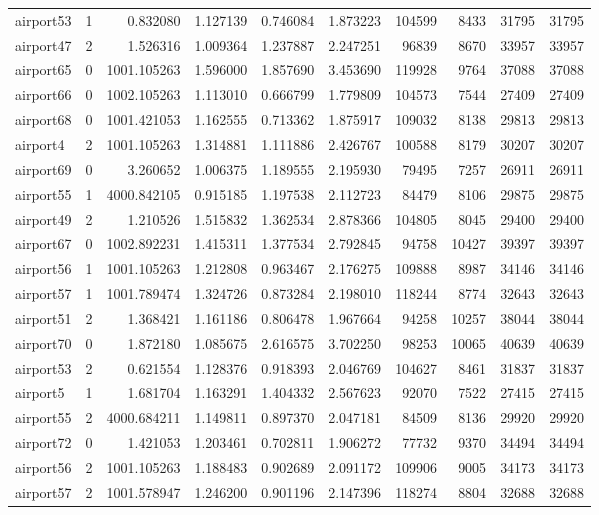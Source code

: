 \begin{longtable}{|l|r|r|r|r|r|r|r|r|r|}
airport53 & 1 & 0.832080 & 1.127139 & 0.746084 & 1.873223 & 104599 & 8433 & 31795 & 31795 \\
airport47 & 2 & 1.526316 & 1.009364 & 1.237887 & 2.247251 & 96839 & 8670 & 33957 & 33957 \\
airport65 & 0 & 1001.105263 & 1.596000 & 1.857690 & 3.453690 & 119928 & 9764 & 37088 & 37088 \\
airport66 & 0 & 1002.105263 & 1.113010 & 0.666799 & 1.779809 & 104573 & 7544 & 27409 & 27409 \\
airport68 & 0 & 1001.421053 & 1.162555 & 0.713362 & 1.875917 & 109032 & 8138 & 29813 & 29813 \\
airport4 & 2 & 1001.105263 & 1.314881 & 1.111886 & 2.426767 & 100588 & 8179 & 30207 & 30207 \\
airport69 & 0 & 3.260652 & 1.006375 & 1.189555 & 2.195930 & 79495 & 7257 & 26911 & 26911 \\
airport55 & 1 & 4000.842105 & 0.915185 & 1.197538 & 2.112723 & 84479 & 8106 & 29875 & 29875 \\
airport49 & 2 & 1.210526 & 1.515832 & 1.362534 & 2.878366 & 104805 & 8045 & 29400 & 29400 \\
airport67 & 0 & 1002.892231 & 1.415311 & 1.377534 & 2.792845 & 94758 & 10427 & 39397 & 39397 \\
airport56 & 1 & 1001.105263 & 1.212808 & 0.963467 & 2.176275 & 109888 & 8987 & 34146 & 34146 \\
airport57 & 1 & 1001.789474 & 1.324726 & 0.873284 & 2.198010 & 118244 & 8774 & 32643 & 32643 \\
airport51 & 2 & 1.368421 & 1.161186 & 0.806478 & 1.967664 & 94258 & 10257 & 38044 & 38044 \\
airport70 & 0 & 1.872180 & 1.085675 & 2.616575 & 3.702250 & 98253 & 10065 & 40639 & 40639 \\
airport53 & 2 & 0.621554 & 1.128376 & 0.918393 & 2.046769 & 104627 & 8461 & 31837 & 31837 \\
airport5 & 1 & 1.681704 & 1.163291 & 1.404332 & 2.567623 & 92070 & 7522 & 27415 & 27415 \\
airport55 & 2 & 4000.684211 & 1.149811 & 0.897370 & 2.047181 & 84509 & 8136 & 29920 & 29920 \\
airport72 & 0 & 1.421053 & 1.203461 & 0.702811 & 1.906272 & 77732 & 9370 & 34494 & 34494 \\
airport56 & 2 & 1001.105263 & 1.188483 & 0.902689 & 2.091172 & 109906 & 9005 & 34173 & 34173 \\
airport57 & 2 & 1001.578947 & 1.246200 & 0.901196 & 2.147396 & 118274 & 8804 & 32688 & 32688 \\

\end{longtable}
